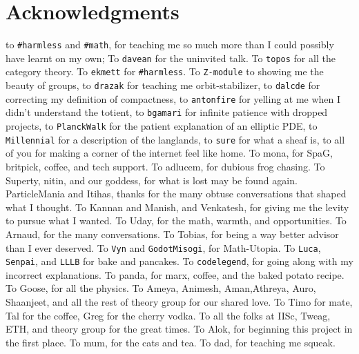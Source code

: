 \documentclass[11pt]{book}
\renewcommand{\baselinestretch}{1.2}
\begin{document}



\newpage
\thispagestyle{empty}
\renewcommand{\thesisdedication}{{\large Copyright \copyright~~Siddharth Bhat, 2021\\}{\large All Rights Reserved\\}}
\thesisdedicationpage



\newpage
\thispagestyle{empty}
\renewcommand{\thesisdedication}{\large To \texttt{\#math} \&\texttt{\#harmless}}
\thesisdedicationpage

\mastersthesis
\renewcommand{\baselinestretch}{1.5}

\chapter*{Acknowledgments}
\label{ch:ack}
to \texttt{\#harmless} and \texttt{\#math}, for teaching me so much more than I could possibly have learnt
on my own; To \texttt{davean} for the uninvited talk. To \texttt{topos} for all the category theory. To \texttt{ekmett} for \texttt{\#harmless}. To \texttt{Z-module} to showing me the beauty of groups, to \texttt{drazak} for teaching me orbit-stabilizer, to \texttt{dalcde} for correcting my definition of compactness, to \texttt{antonfire} for yelling at me when I didn't understand the totient, to \texttt{bgamari} for infinite patience with dropped projects, to \texttt{PlanckWalk} for the patient explanation of an elliptic PDE, to \texttt{Millennial} for a description of the langlands, to \texttt{sure} for what a sheaf is, to all of you for making a corner of the internet feel like home. To mona, for SpaG, britpick, coffee, and tech support. To adlucem, for dubious frog chasing. To Superty, nitin, and our goddess, for what is lost may be found again. ParticleMania and Itihas, thanks for the many obtuse conversations that shaped what I thought. To Kannan and Manish, and Venkatesh, for giving me the levity to pursue what I wanted. To Uday, for the math, warmth, and opportunities. To Arnaud, for the many conversations. To Tobias, for being a way better advisor than I  ever deserved. To \texttt{Vyn} and \texttt{GodotMisogi}, for Math-Utopia. To \texttt{Luca}, \texttt{Senpai}, and \texttt{LLLB} for bake and pancakes. To \texttt{codelegend}, for going along with my incorrect explanations. To panda, for marx, coffee, and the baked potato recipe. To Goose, for all the physics. To Ameya, Animesh, Aman,Athreya, Auro, Shaanjeet, and all the rest of theory group for our shared love. To  Timo for mate, Tal for the coffee, Greg for the cherry vodka. To all the folks at IISc, Tweag,  ETH, and theory group for the great times. To Alok, for beginning this project in the first place. To mum, for the cats and tea. To dad, for teaching me squeak.
\end{document}
